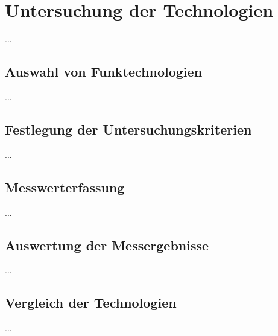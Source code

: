 \chapter{Untersuchung der Technologien}
\label{sec:Untersuchung der Technologien}

... 

\section{Auswahl von Funktechnologien}
\label{sec:Auswahl von Funktechnologien}

...

\section{Festlegung der Untersuchungskriterien}
\label{sec:Festlegung der Untersuchungskriterien}

...

\section{Messwerterfassung}
\label{sec:Messwerterfassung}

...

\section{Auswertung der Messergebnisse}
\label{sec:Auswertung der Messergebnisse}

...

\section{Vergleich der Technologien}
\label{sec:Vergleich der Technologien}

...